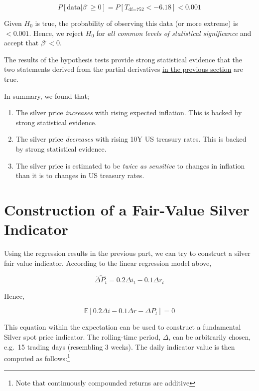 \documentclass[
  12pt,
]{article}
\providecommand{\tightlist}{%
  \setlength{\itemsep}{0pt}\setlength{\parskip}{0pt}}
\begin{document}
\[P[ \textrm{data} | \beta^{_r} \geq 0] = P[T_{\textrm{df=}752} < -6.18] \mathbf{< 0.001}\]

Given \(H_0\) is true, the probability of observing this data (or more
extreme) is \(< 0.001\). Hence, we reject \(H_0\) for \emph{all common
levels of statistical significance} and accept that \(\beta^{_r} < 0\).

The results of the hypothesis tests provide strong statistical evidence
that the two statements derived from the partial derivatives
\protect\hyperlink{silver-spot-pricing-hypothesis}{in the previous
section} are true.

In summary, we found that;

\begin{enumerate}
\def\labelenumi{\arabic{enumi}.}
\tightlist
\item
  The silver price \emph{increases} with rising expected inflation. This
  is backed by strong statistical evidence.
\item
  The silver price \emph{decreases} with rising 10Y US treasury rates.
  This is backed by strong statistical evidence.
\item
  The silver price is estimated to be \emph{twice as sensitive} to
  changes in inflation than it is to changes in US treasury rates.
\end{enumerate}

\hypertarget{construction-of-a-fair-value-silver-indicator}{%
\section{Construction of a Fair-Value Silver
Indicator}\label{construction-of-a-fair-value-silver-indicator}}

Using the regression results in the previous part, we can try to
construct a silver fair value indicator. According to the linear
regression model above,

\[\widehat{\Delta P_t} = 0.2 \Delta i_t -0.1 \Delta r_t\]

Hence,

\[\mathbb{E}[0.2 \Delta i - 0.1 \Delta r - \Delta P_t] = 0\]

This equation within the expectation can be used to construct a
fundamental Silver spot price indicator. The rolling-time period,
\(\Delta\), can be arbitrarily chosen, e.g.~15 trading days (resembling
3 weeks). The daily indicator value is then computed as
follows:\footnote{Note that continuously compounded returns are additive}
\end{document}
